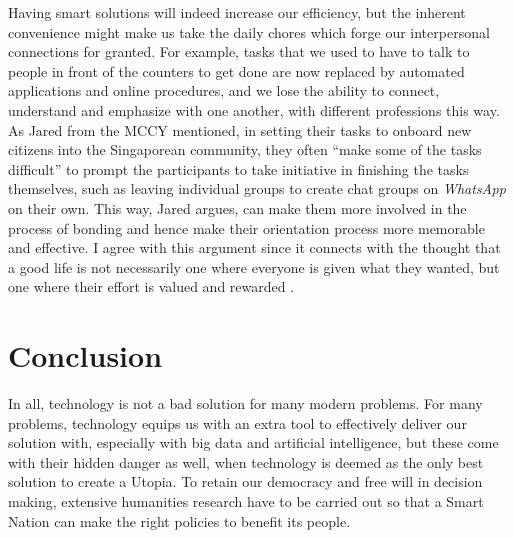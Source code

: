 \documentclass[11pt]{article}
\begin{document}
Having smart solutions will indeed increase our efficiency, but the inherent
convenience might make us take the daily chores which forge our interpersonal
connections for granted. For example, tasks that we used to have to talk to
people in front of the counters to get done are now replaced by automated
applications and online procedures, and we lose the ability to connect,
understand and emphasize with one another, with different professions this way.
As Jared from the MCCY mentioned, in setting their tasks to onboard new citizens
into the Singaporean community, they often ``make some of the tasks difficult''
to prompt the participants to take initiative in finishing the tasks themselves,
such as leaving individual groups to create chat groups on \emph{WhatsApp} on their
own. This way, Jared argues, can make them more involved in the process of
bonding and hence make their orientation process more memorable and effective. I
agree with this argument since it connects with the thought that a good life is
not necessarily one where everyone is given what they wanted, but one where
their effort is valued and rewarded
\cite{fouriezos90_task_diffic_increas_thres_rewar_brain_stimul}.

\section{Conclusion}
\label{sec:orge7c1f21}
In all, technology is not a bad solution for many modern problems. For many
problems, technology equips us with an extra tool to effectively deliver our
solution with, especially with big data and artificial intelligence, but these
come with their hidden danger as well, when technology is deemed as the only
best solution to create a Utopia. To retain our democracy and free will
in decision making, extensive humanities research have to be carried out so that
a Smart Nation can make the right policies to benefit its people.
\printbibliography
\end{document}
